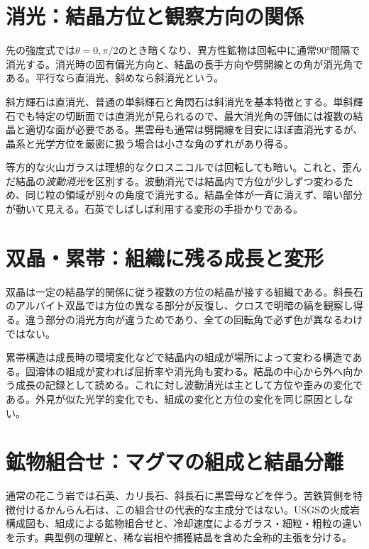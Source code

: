 \section{消光：結晶方位と観察方向の関係}
\label{theory:mineral:extinction}
先の強度式では$\theta=0,\pi/2$のとき暗くなり、異方性鉱物は回転中に通常90°間隔で消光する。消光時の固有偏光方向と、結晶の長手方向や劈開線との角が消光角である。平行なら直消光、斜めなら斜消光という。

斜方輝石は直消光、普通の単斜輝石と角閃石は斜消光を基本特徴とする。単斜輝石でも特定の切断面では直消光が見られるので、最大消光角の評価には複数の結晶と適切な面が必要である\parencite{nelson_inosilicates}。黒雲母も通常は劈開線を目安にほぼ直消光するが、晶系と光学方位を厳密に扱う場合は小さな角のずれがあり得る。

等方的な火山ガラスは理想的なクロスニコルでは回転しても暗い。これと、歪んだ結晶の\emph{波動消光}を区別する。波動消光では結晶内で方位が少しずつ変わるため、同じ粒の領域が別々の角度で消光する。結晶全体が一斉に消えず、暗い部分が動いて見える。石英でしばしば利用する変形の手掛かりである\parencite{nelson_biaxial}。

\section{双晶・累帯：組織に残る成長と変形}
\label{theory:mineral:texture}
双晶は一定の結晶学的関係に従う複数の方位の結晶が接する組織である。斜長石のアルバイト双晶では方位の異なる部分が反復し、クロスで明暗の縞を観察し得る\parencite{hom_albite}。違う部分の消光方向が違うためであり、全ての回転角で必ず色が異なるわけではない。

累帯構造は成長時の環境変化などで結晶内の組成が場所によって変わる構造である。固溶体の組成が変われば屈折率や消光角も変わる。結晶の中心から外へ向かう成長の記録として読める。これに対し波動消光は主として方位や歪みの変化である。外見が似た光学的変化でも、組成の変化と方位の変化を同じ原因としない\parencite{nelson_biaxial}。

\section{鉱物組合せ：マグマの組成と結晶分離}
\label{theory:mineral:assemblage}
通常の花こう岩では石英、カリ長石、斜長石に黒雲母などを伴う。苦鉄質側を特徴付けるかんらん石は、この組合せの代表的な主成分ではない。USGSの火成岩構成図も、組成による鉱物組合せと、冷却速度によるガラス・細粒・粗粒の違いを示す\parencite{usgs_igneous_components}。典型例の理解と、稀な岩相や捕獲結晶を含めた全称的主張を分ける。

